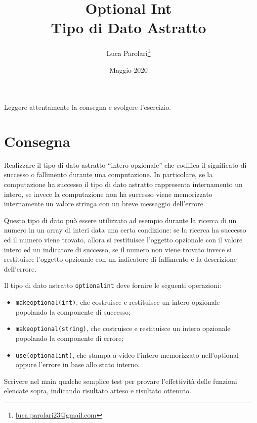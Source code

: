 \documentclass[addpoints,12pt,answers]{exam}
\author{Luca Parolari\footnote{\href{mailto:luca.parolari23@gmail.com}{luca.parolari23@gmail.com}}}
\begin{document}
    
    \title{Optional Int\\ \large Tipo di Dato Astratto}
    \date{Maggio 2020}
    
    \maketitle
    
    Leggere attentamente la consegna e svolgere l'esercizio.
    
    \section{Consegna}

    Realizzare il tipo di dato astratto ``intero opzionale'' che codifica il significato di successo o fallimento durante una computazione. In particolare, se la computazione ha successo il tipo di dato astratto rappresenta internamento un intero, se invece la computazione non ha successo viene memorizzato internamente un valore stringa con un breve messaggio dell'errore.

    Questo tipo di dato può essere utilizzato ad esempio durante la ricerca di un numero in un array di interi data una certa condizione: se la ricerca ha successo ed il numero viene trovato, allora si restituisce l'oggetto opzionale con il valore intero ed un indicatore di successo, se il numero non viene trovato invece si restituisce l'oggetto opzionale con un indicatore di fallimento e la descrizione dell'errore.

    Il tipo di dato astratto \texttt{optional\textunderscore int} deve fornire le seguenti operazioni:
    \begin{itemize}
        \item \texttt{make\textunderscore optional(int)}, che costruisce e restituisce un intero opzionale popolando la componente di successo;
        \item \texttt{make\textunderscore optional(string)}, che costruisce e restituisce un intero opzionale popolando la componente di errore;
        \item \texttt{use(optional\textunderscore int)}, che stampa a video l'intero memorizzato nell'optional oppure l'errore in base allo stato interno.
    \end{itemize}
    
    Scrivere nel main qualche semplice test per provare l'effettività delle funzioni elencate sopra, indicando risultato atteso e risultato ottenuto.
\end{document}
